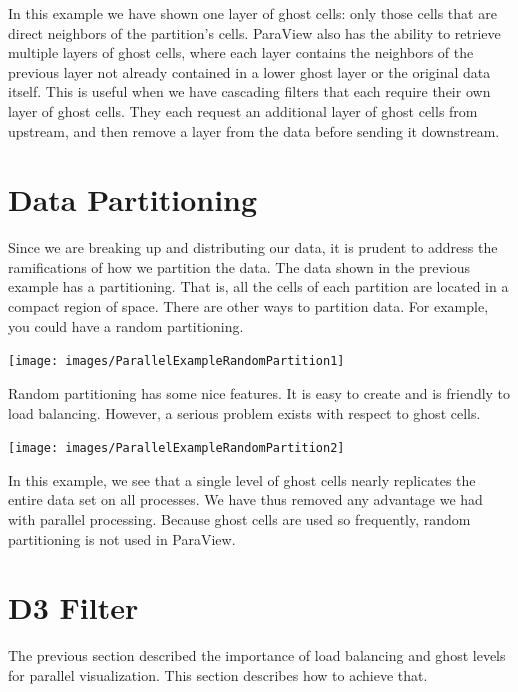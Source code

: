 In this example we have shown one layer of ghost cells: only those cells
that are direct neighbors of the partition's cells.  ParaView also has the
ability to retrieve multiple layers of ghost cells, where each layer
contains the neighbors of the previous layer not already contained in a
lower ghost layer or the original data itself.  This is useful when we have
cascading filters that each require their own layer of ghost cells.  They
each request an additional layer of ghost cells from upstream, and then
remove a layer from the data before sending it downstream.

\section{Data Partitioning}

Since we are breaking up and distributing our data, it is prudent to
address the ramifications of how we partition the data.  The data shown in
the previous example has a  partitioning.  That
is, all the cells of each partition are located in a compact region of
space.  There are other ways to partition data.  For example, you could
have a random partitioning.

\begin{inlinefig}
  \texttt{[image: images/ParallelExampleRandomPartition1]}
\end{inlinefig}

Random partitioning has some nice features.  It is easy to create and is
friendly to load balancing.  However, a serious problem exists with respect
to ghost cells.

\begin{inlinefig}
  \texttt{[image: images/ParallelExampleRandomPartition2]}
\end{inlinefig}

In this example, we see that a single level of ghost cells nearly
replicates the entire data set on all processes.  We have thus removed any
advantage we had with parallel processing.  Because ghost cells are used so
frequently, random partitioning is not used in ParaView.

\section{D3 Filter}

The previous section described the importance of load balancing and ghost
levels for parallel visualization.  This section describes how to achieve
that.

